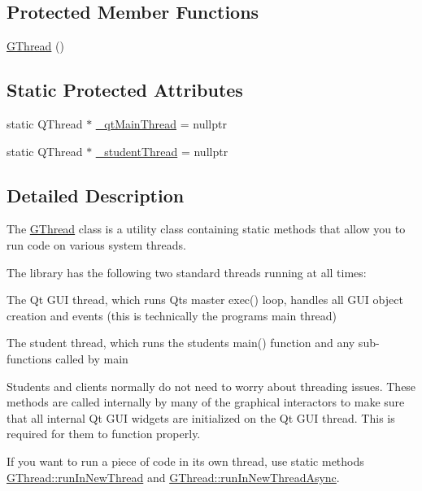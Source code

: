 \subsection*{Protected Member Functions}
\begin{DoxyCompactItemize}
\item 
\mbox{\hyperlink{classGThread_a7db4904140090c18f864e09283f2b529}{G\+Thread}} ()
\end{DoxyCompactItemize}
\subsection*{Static Protected Attributes}
\begin{DoxyCompactItemize}
\item 
static Q\+Thread $\ast$ \mbox{\hyperlink{classGThread_aa69140e62a4dad275e74a6c1174eb4e5}{\+\_\+qt\+Main\+Thread}} = nullptr
\item 
static Q\+Thread $\ast$ \mbox{\hyperlink{classGThread_a15ae7c95a54d17d2c307ebba42fe3405}{\+\_\+student\+Thread}} = nullptr
\end{DoxyCompactItemize}


\subsection{Detailed Description}
The \mbox{\hyperlink{classGThread}{G\+Thread}} class is a utility class containing static methods that allow you to run code on various system threads. 

The library has the following two standard threads running at all times\+:


\begin{DoxyEnumerate}
\item The Qt G\+UI thread, which runs Qt\textquotesingle{}s master exec() loop, handles all G\+UI object creation and events (this is technically the program\textquotesingle{}s main thread)


\item The student thread, which runs the student\textquotesingle{}s main() function and any sub-\/functions called by main

Students and clients normally do not need to worry about threading issues. These methods are called internally by many of the graphical interactors to make sure that all internal Qt G\+UI widgets are initialized on the Qt G\+UI thread. This is required for them to function properly.

If you want to run a piece of code in its own thread, use static methods {\ttfamily \mbox{\hyperlink{classGThread_ac9475674a195d39d457307b3e7365ddd}{G\+Thread\+::run\+In\+New\+Thread}}} and {\ttfamily \mbox{\hyperlink{classGThread_ad40c76521d01473a3eea90c01000d9e2}{G\+Thread\+::run\+In\+New\+Thread\+Async}}}. 
\end{DoxyEnumerate}

